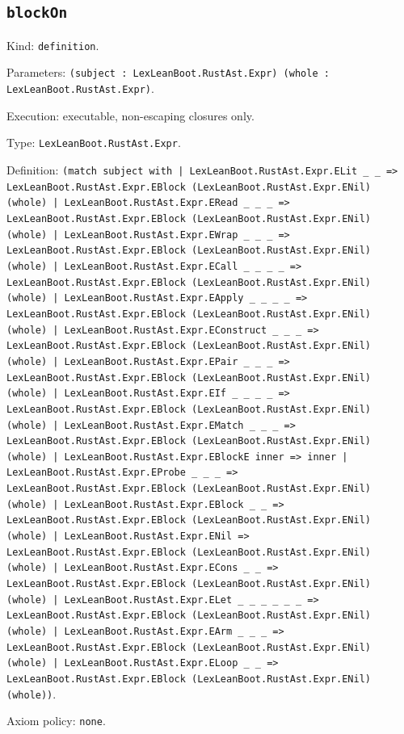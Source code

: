 \documentclass[11pt]{article}
\begin{document}
\subsection*{\texttt{blockOn}}
\noindent Kind: \texttt{definition}.\par
\noindent Parameters: \texttt{(subject : LexLeanBoot.RustAst.Expr) (whole : LexLeanBoot.RustAst.Expr)}.\par
\noindent Execution: executable, non-escaping closures only.\par
\noindent Type: \texttt{LexLeanBoot.RustAst.Expr}.\par
\noindent Definition: \texttt{(match subject with | LexLeanBoot.RustAst.Expr.ELit \_ \_ => LexLeanBoot.RustAst.Expr.EBlock (LexLeanBoot.RustAst.Expr.ENil) (whole) | LexLeanBoot.RustAst.Expr.ERead \_ \_ \_ => LexLeanBoot.RustAst.Expr.EBlock (LexLeanBoot.RustAst.Expr.ENil) (whole) | LexLeanBoot.RustAst.Expr.EWrap \_ \_ \_ => LexLeanBoot.RustAst.Expr.EBlock (LexLeanBoot.RustAst.Expr.ENil) (whole) | LexLeanBoot.RustAst.Expr.ECall \_ \_ \_ \_ => LexLeanBoot.RustAst.Expr.EBlock (LexLeanBoot.RustAst.Expr.ENil) (whole) | LexLeanBoot.RustAst.Expr.EApply \_ \_ \_ \_ => LexLeanBoot.RustAst.Expr.EBlock (LexLeanBoot.RustAst.Expr.ENil) (whole) | LexLeanBoot.RustAst.Expr.EConstruct \_ \_ \_ => LexLeanBoot.RustAst.Expr.EBlock (LexLeanBoot.RustAst.Expr.ENil) (whole) | LexLeanBoot.RustAst.Expr.EPair \_ \_ \_ => LexLeanBoot.RustAst.Expr.EBlock (LexLeanBoot.RustAst.Expr.ENil) (whole) | LexLeanBoot.RustAst.Expr.EIf \_ \_ \_ \_ => LexLeanBoot.RustAst.Expr.EBlock (LexLeanBoot.RustAst.Expr.ENil) (whole) | LexLeanBoot.RustAst.Expr.EMatch \_ \_ \_ => LexLeanBoot.RustAst.Expr.EBlock (LexLeanBoot.RustAst.Expr.ENil) (whole) | LexLeanBoot.RustAst.Expr.EBlockE inner => inner | LexLeanBoot.RustAst.Expr.EProbe \_ \_ \_ => LexLeanBoot.RustAst.Expr.EBlock (LexLeanBoot.RustAst.Expr.ENil) (whole) | LexLeanBoot.RustAst.Expr.EBlock \_ \_ => LexLeanBoot.RustAst.Expr.EBlock (LexLeanBoot.RustAst.Expr.ENil) (whole) | LexLeanBoot.RustAst.Expr.ENil => LexLeanBoot.RustAst.Expr.EBlock (LexLeanBoot.RustAst.Expr.ENil) (whole) | LexLeanBoot.RustAst.Expr.ECons \_ \_ => LexLeanBoot.RustAst.Expr.EBlock (LexLeanBoot.RustAst.Expr.ENil) (whole) | LexLeanBoot.RustAst.Expr.ELet \_ \_ \_ \_ \_ \_ => LexLeanBoot.RustAst.Expr.EBlock (LexLeanBoot.RustAst.Expr.ENil) (whole) | LexLeanBoot.RustAst.Expr.EArm \_ \_ \_ => LexLeanBoot.RustAst.Expr.EBlock (LexLeanBoot.RustAst.Expr.ENil) (whole) | LexLeanBoot.RustAst.Expr.ELoop \_ \_ => LexLeanBoot.RustAst.Expr.EBlock (LexLeanBoot.RustAst.Expr.ENil) (whole))}.\par
\noindent Axiom policy: \texttt{none}.\par
\end{document}
